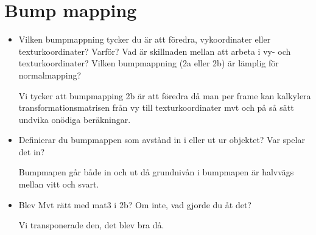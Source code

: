 \documentclass[a4paper,12pt]{article}
\begin{document}
\section{Bump mapping}

\begin{itemize}
  \item Vilken bumpmappning tycker du är att föredra, vykoordinater eller texturkoordinater? Varför? Vad är skillnaden mellan att arbeta i vy- och texturkoordinater? Vilken bumpmappning (2a eller 2b) är lämplig för normalmapping?

    Vi tycker att bumpmapping 2b är att föredra då man per frame kan kalkylera transformationsmatrisen från vy till texturkoordinater mvt och på så sätt undvika onödiga beräkningar.

  \item Definierar du bumpmappen som avstånd in i eller ut ur objektet? Var spelar det in?

    Bumpmapen går både in och ut då grundnivån i bumpmapen är halvvägs mellan vitt och svart.

  \item Blev Mvt rätt med mat3 i 2b? Om inte, vad gjorde du åt det?

    Vi transponerade den, det blev bra då.

\end{itemize}
\end{document}
